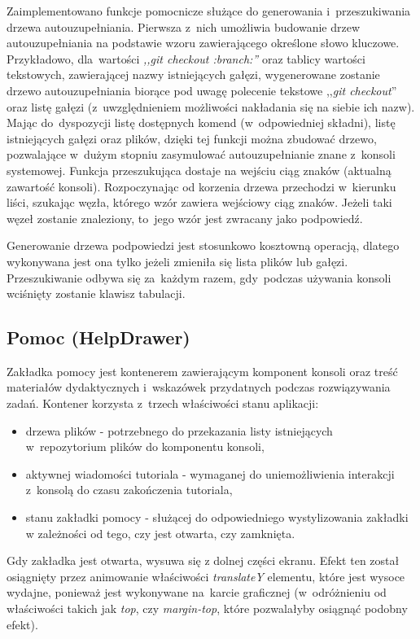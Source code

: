 \documentclass[12pt,a4paper,polish,thesis]{dcsbook}
\begin{document}
{	Zaimplementowano funkcje pomocnicze służące do generowania i~przeszukiwania drzewa autouzupełniania. Pierwsza z~nich umożliwia budowanie drzew autouzupełniania na podstawie wzoru zawierającego określone słowo kluczowe. Przykładowo, dla~wartości \textit{,,git checkout :branch:''} oraz tablicy wartości tekstowych, zawierającej nazwy istniejących gałęzi, wygenerowane zostanie drzewo autouzupełniania biorące pod uwagę polecenie tekstowe ,,\textit{git checkout}'' oraz listę gałęzi (z~uwzględnieniem możliwości nakładania się na siebie ich nazw). Mając do~dyspozycji listę dostępnych komend (w~odpowiedniej składni), listę istniejących gałęzi oraz plików, dzięki tej funkcji można zbudować drzewo, pozwalające w~dużym stopniu zasymulować autouzupełnianie znane z~konsoli systemowej. Funkcja przeszukująca dostaje na wejściu ciąg znaków (aktualną zawartość konsoli). Rozpoczynając od korzenia drzewa przechodzi w~kierunku liści, szukając węzła, którego wzór zawiera wejściowy ciąg znaków. Jeżeli taki węzeł zostanie znaleziony, to~jego wzór jest zwracany jako podpowiedź.

	Generowanie drzewa podpowiedzi jest stosunkowo kosztowną operacją, dlatego wykonywana jest ona tylko jeżeli zmieniła się lista plików lub gałęzi. Przeszukiwanie odbywa się za~każdym razem, gdy~podczas używania konsoli wciśnięty zostanie klawisz tabulacji.

	\subsection{Pomoc (HelpDrawer)}

	Zakładka pomocy jest kontenerem zawierającym komponent konsoli oraz treść materiałów dydaktycznych i~wskazówek przydatnych podczas rozwiązywania zadań. Kontener korzysta z~trzech właściwości stanu aplikacji:
	\begin{itemize}
		\item drzewa plików - potrzebnego do przekazania listy istniejących w~repozytorium plików do komponentu konsoli,
		\item aktywnej wiadomości tutoriala - wymaganej do uniemożliwienia interakcji z~konsolą do czasu zakończenia tutoriala,
		\item stanu zakładki pomocy - służącej do odpowiedniego wystylizowania zakładki w zależności od tego, czy jest otwarta, czy zamknięta.
	\end{itemize}
	  Gdy zakładka jest otwarta, wysuwa się z dolnej części ekranu. Efekt ten został osiągnięty przez animowanie właściwości \textit{translateY} elementu, które jest wysoce wydajne, ponieważ jest wykonywane na~karcie graficznej (w~odróżnieniu od właściwości takich jak \textit{top}, czy \textit{margin-top}, które pozwalałyby osiągnąć podobny efekt). 

}
\end{document}
